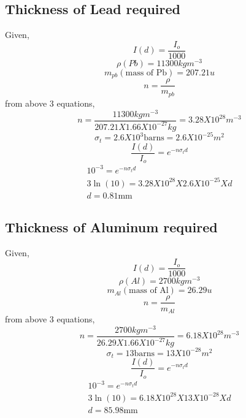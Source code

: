 \documentclass[11pt, a4paper]{article}
\begin{document}
\subsection*{Thickness of Lead required}
Given, 
\begin{equation}
    I(d) = \frac{I_{o} }{1000}
\end{equation}
\begin{equation}
    \rho(Pb) = 11300 kg m^{-3} 
\end{equation}
\begin{equation}
   m_{pb} (\text{mass of Pb}) = 207.21 u  
\end{equation}
\begin{equation}
    n = \frac{\rho}{m_{pb}}
\end{equation} 
from above 3 equations, 
\begin{equation}
    n = \frac{11300 kgm^{-3}}{207.21X1.66
    X10^{-27}kg} = 3.28 X 10^{28} m^{-3}  
\end{equation} 
\begin{equation}
    \sigma_t = 2.6X10^3 \text{barns} = 2.6X10^{-25} m^2
\end{equation}
\begin{equation}
    \frac{I(d)}{I_o} = e^{-n \sigma_t d}
\end{equation}
\begin{gather}
    10^{-3} = e^{-n \sigma_t d} \\
    3\ln (10) = 3.28X10^{28}X2.6X10^{-25}Xd \\
    d = 0.81 \text{mm} 
\end{gather}
\subsection*{Thickness of Aluminum required }
Given, 
\begin{equation}
    I(d) = \frac{I_{o} }{1000}
\end{equation}
\begin{equation}
    \rho(Al) = 2700 kg m^{-3} 
\end{equation}
\begin{equation}
   m_{Al} (\text{mass of Al}) = 26.29 u  
\end{equation}
\begin{equation}
    n = \frac{\rho}{m_{Al}}
\end{equation} 
from above 3 equations, 
\begin{equation}
    n = \frac{2700 kgm^{-3}}{26.29X1.66
    X10^{-27}kg} = 6.18 X 10^{28}  m^{-3}  
\end{equation} 
\begin{equation}
    \sigma_t = 13 \text{barns} = 13X10^{-28} m^2
\end{equation}
\begin{equation}
    \frac{I(d)}{I_o} = e^{-n \sigma_t d}
\end{equation}
\begin{gather}
    10^{-3} = e^{-n \sigma_t d} \\
    3\ln (10) = 6.18X10^{28}X13X10^{-28}Xd \\
    d = 85.98 \text{mm} 
\end{gather}
\end{document}
